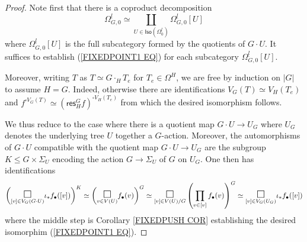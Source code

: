 \documentclass[a4paper,10pt]{article}%
\begin{document}
\begin{proof}
Note first that there is a coproduct decomposition
\[\Omega_{G,0}^{\underline{l}}
\simeq \coprod_{U \in \mathsf{Iso}
\left(\Omega^{\underline{l}}_0\right)}
\Omega_{G,0}^{\underline{l}}[U]\]
where $\Omega_{G,0}^{\underline{l}}[U]$ is the full subcategory
formed by the quotients of $G \cdot U$.
It suffices to establish (\ref{FIXEDPOINT1 EQ}) for each subcategory 
$\Omega_{G,0}^{\underline{l}}[U]$. 

Moreover, writing $T$ as $T \simeq G \cdot_H T_e$ for $T_e \in \Omega^H$, we are free by induction on $|G|$ to assume $H=G$.
Indeed, otherwise there are identifications
$V_G(T) \simeq V_H(T_e)$ and 
$f^{\square V_G(T)}\simeq (\mathsf{res}^G_H f)^{\square V_H(T_e)}$ from which the desired isomorphism follows.

We thus reduce to the case where there is a quotient map 
$G \cdot U \to U_G$
where $U_G$ denotes the underlying tree $U$ together a $G$-action. Moreover, the automorphisms of $G \cdot U$ compatible with the quotient map $G \cdot U \to U_G$
are the subgroup $K \leq G \times \Sigma_U$
encoding the action $G \to \Sigma_U$ of $G$ on $U_G$.
One then has identifications
\begin{align*}
\left(
	\underset{[v] \in V_G(G \cdot U)}{\mathlarger{\mathlarger{\square}}}
	\iota_{\**} f_{\bullet}([v])
	\right)^K
\simeq 
	\left(
	\underset{v \in V(U)}{\mathlarger{\mathlarger{\square}}}
	f_{\bullet}(v)
	\right)^G
\simeq 
	\underset{[v] \in V(U)/G}{\mathlarger{\mathlarger{\square}}}
	\left(
	\prod_{v \in [v]}
	f_{\bullet}(v)
	\right)^G
\simeq
	\underset{[v] \in V_G(U_G)}{\mathlarger{\mathlarger{\square}}}
	\iota_{\**}
	f_{\bullet}([v])
\end{align*}
where the middle step is Corollary \ref{FIXEDPUSH COR}
establishing the desired isomorphim (\ref{FIXEDPOINT1 EQ}).
\end{proof}
\end{document}
